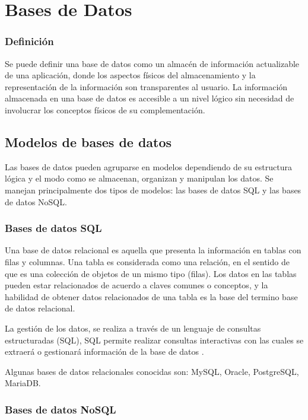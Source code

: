 \section{Bases de Datos}

\subsubsection{Definición}

Se puede definir una base de datos como un almacén de información actualizable de una aplicación, donde los aspectos físicos del almacenamiento y la representación de la información son transparentes al usuario. La información
almacenada en una base de datos es accesible a un nivel lógico sin necesidad de involucrar los
conceptos físicos de su complementación.\cite{6-josemy}

\subsection{Modelos de bases de datos} 

Las bases de datos pueden agruparse en modelos dependiendo de su estructura lógica y el modo como se almacenan, organizan y manipulan los datos. Se manejan principalmente dos tipos de modelos: las bases de
datos SQL y las bases de datos NoSQL.

\subsubsection{Bases de datos SQL}


Una base de datos relacional es aquella que presenta la información en tablas con filas y columnas. Una tabla es considerada como una relación, en el sentido de que es una colección de objetos de un mismo tipo (filas). Los datos en las tablas pueden estar relacionados de acuerdo a claves comunes o conceptos, y la habilidad de obtener datos relacionados de una tabla es la base del termino base de datos relacional.\cite{orcman}

La gestión de los datos, se  realiza a través de un lenguaje de consultas estructuradas (SQL), SQL permite realizar consultas interactivas con las cuales se extraerá o gestionará información de la base de datos \cite{25-carrejo}.

Algunas bases de datos relacionales conocidas son: MySQL, Oracle, PostgreSQL, MariaDB.

\subsubsection{Bases de datos NoSQL}

